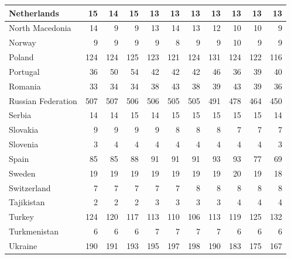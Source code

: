 \begin{table}
\begin{tabular}{|l|r|r|r|r|r|r|r|r|r|r|}
                   Netherlands&     15&     14&     15&     13&     13&     13&     13&     13&     13&     13\\\hline
               North Macedonia&     14&      9&      9&     13&     14&     13&     12&     10&     10&      9\\\hline
                        Norway&      9&      9&      9&      9&      8&      9&      9&     10&      9&      9\\\hline
                        Poland&    124&    124&    125&    123&    121&    124&    131&    124&    122&    116\\\hline
                      Portugal&     36&     50&     54&     42&     42&     42&     46&     36&     39&     40\\\hline
                       Romania&     33&     34&     34&     38&     43&     38&     39&     43&     39&     36\\\hline
            Russian Federation&    507&    507&    506&    506&    505&    505&    491&    478&    464&    450\\\hline
                        Serbia&     14&     14&     15&     14&     15&     15&     15&     15&     15&     14\\\hline
                      Slovakia&      9&      9&      9&      9&      8&      8&      8&      7&      7&      7\\\hline
                      Slovenia&      3&      4&      4&      4&      4&      4&      4&      4&      4&      3\\\hline
                         Spain&     85&     85&     88&     91&     91&     91&     93&     93&     77&     69\\\hline
                        Sweden&     19&     19&     19&     19&     19&     19&     19&     20&     19&     18\\\hline
                   Switzerland&      7&      7&      7&      7&      7&      8&      8&      8&      8&      8\\\hline
                    Tajikistan&      2&      2&      2&      3&      3&      3&      3&      4&      4&      4\\\hline
                        Turkey&    124&    120&    117&    113&    110&    106&    113&    119&    125&    132\\\hline
                  Turkmenistan&      6&      6&      6&      7&      7&      7&      7&      6&      6&      6\\\hline
                       Ukraine&    190&    191&    193&    195&    197&    198&    190&    183&    175&    167\\\hline

\end{tabular}
\end{table}
